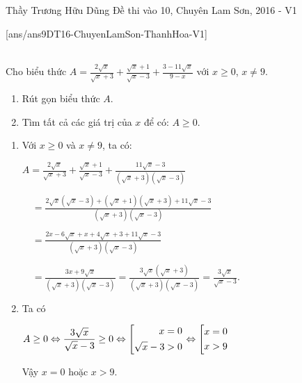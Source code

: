 \begin{name}
{Thầy  Trương Hữu Dũng}
{Đề thi vào 10, Chuyên Lam Sơn, 2016 - V1}
\end{name}
\setcounter{ex}{0}
[ans/ans9DT16-ChuyenLamSon-ThanhHoa-V1]
\begin{ex}%
	\hfill \\
    Cho biểu thức $\displaystyle A = \frac{2 \sqrt{x}}{\sqrt{x}+3}+ \frac{\sqrt{x}+1}{\sqrt{x}-3}+ \frac{3-11\sqrt{x}}{9-x}$ với $x \ge 0$, $x \ne 9$.
    \begin{enumerate}
        \item Rút gọn biểu thức $A$.
        \item Tìm tất cả các giá trị của $x$ để có: $A \ge 0$.
    \end{enumerate}
\loigiai
    {
    	\begin{enumerate}
    	\item Với $x \ge 0$ và $x \ne 9$, ta có:
    	
    	$A= \displaystyle \frac{2 \sqrt{x}}{\sqrt{x}+3} + \frac{\sqrt{x}+1}{\sqrt{x}-3}+ \frac{11\sqrt{x}-3}{\left(\sqrt{x}+3\right) \left(\sqrt{x}-3\right)}$
    	
    	$\quad = \displaystyle \frac{2\sqrt{x} \left(\sqrt{x}-3\right)+ \left(\sqrt{x}+1\right)\left(\sqrt{x}+3\right) +11\sqrt{x}-3}{\left(\sqrt{x}+3\right) \left(\sqrt{x}-3\right)}$
    	
    	$\quad= \displaystyle \frac{2x-6 \sqrt{x}+x+4\sqrt{x}+3+11\sqrt{x}-3}{\left(\sqrt{x}+3\right) \left(\sqrt{x}-3\right)}$
    	
    	$\quad = \displaystyle \frac{3x + 9\sqrt{x}}{\left(\sqrt{x}+3\right)\left(\sqrt{x}-3\right)}=\frac{3\sqrt{x}\left(\sqrt{x}+3\right)}{\left(\sqrt{x}+3\right)\left(\sqrt{x}-3\right)} =\frac{3\sqrt{x}}{\sqrt{x}-3}$.
    	
    	\item Ta có 
    	
    	$A \ge 0 \Leftrightarrow \displaystyle \frac{3 \sqrt{x}}{\sqrt{x}-3} \ge 0 \Leftrightarrow \left[\begin{aligned}x=0 \\\sqrt{x}-3>0\end{aligned}\right. \Leftrightarrow \left[\begin{aligned}x=0 \\ x>9\end{aligned}\right.$
    	
    	Vậy $x=0$ hoặc $x>9$.
   		\end{enumerate}
    }
\end{ex}

